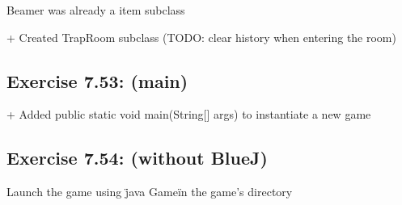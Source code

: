 \documentclass[twoside,french]{report}
\begin{document}
Beamer was already a item subclass

+ Created TrapRoom subclass (TODO: clear history when entering the room)

\subsection*{Exercise 7.53: (main)}

+ Added public static void main(String[] args) to instantiate a new game

\subsection*{Exercise 7.54: (without BlueJ)}

Launch the game using \"java Game\" in the game's directory
\end{document}
